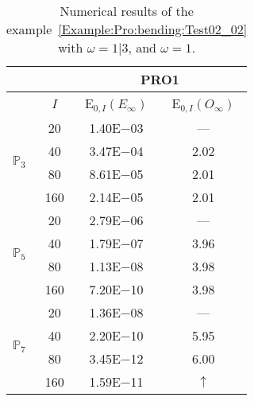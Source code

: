 \begin{table}[H]
\caption{Numerical results of the example~\ref{Example:Pro:bending:Test02_02} with $\omega=1|3$, and $\omega=1$.}
\setlength{\tabcolsep}{5pt}
\centering
\begin{tabular}{@{}l c c c@{}}
\toprule
 &  & \multicolumn{2}{c}{PRO1}\\
\midrule
 & $I$ & E$_{0,I}(E_{\infty})$ & E$_{0,I}(O_{\infty})$\\
\midrule
\multirow{4}{*}{$\mathbb{P}_{3}$} & 20 & 1.40E$-$03 & ---\\
 & 40 & 3.47E$-$04 & 2.02\\
 & 80 & 8.61E$-$05 & 2.01\\
 & 160 & 2.14E$-$05 & 2.01\\
\midrule
\multirow{4}{*}{$\mathbb{P}_{5}$} & 20 & 2.79E$-$06 & ---\\
 & 40 & 1.79E$-$07 & 3.96\\
 & 80 & 1.13E$-$08 & 3.98\\
 & 160 & 7.20E$-$10 & 3.98\\
\midrule
\multirow{4}{*}{$\mathbb{P}_{7}$} & 20 & 1.36E$-$08 & ---\\
 & 40 & 2.20E$-$10 & 5.95\\
 & 80 & 3.45E$-$12 & 6.00\\
 & 160 & 1.59E$-$11 & $\uparrow$\\
\bottomrule
\end{tabular}
\label{Table:PRO:test_02_02_test6}
\end{table}

